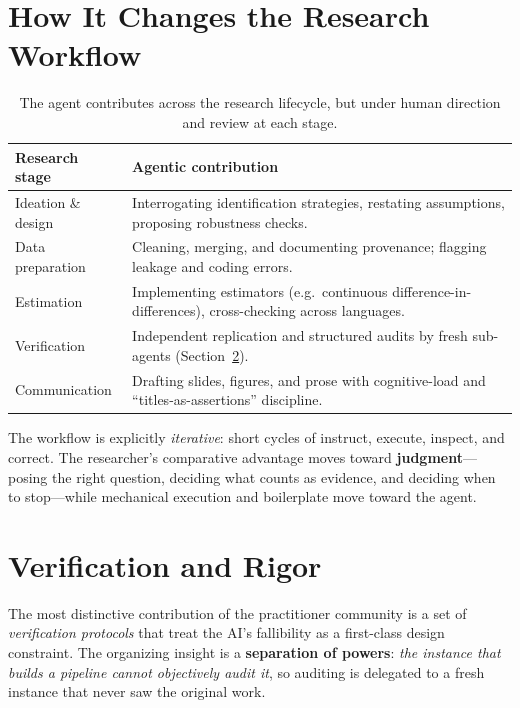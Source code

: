 \documentclass[11pt]{article}
\begin{document}
\section{How It Changes the Research Workflow}
\begin{table}[h]
\centering
\begin{tabular}{@{}p{}p{}@{}}
\toprule
\textbf{Research stage} & \textbf{Agentic contribution} \\
\midrule
Ideation \& design & Interrogating identification strategies, restating
assumptions, proposing robustness checks. \\
Data preparation & Cleaning, merging, and documenting provenance;
flagging leakage and coding errors. \\
Estimation & Implementing estimators (e.g.\ continuous
difference-in-differences), cross-checking across languages. \\
Verification & Independent replication and structured audits by fresh
sub-agents (Section~\ref{sec:verify}). \\
Communication & Drafting slides, figures, and prose with cognitive-load and
``titles-as-assertions'' discipline. \\
\bottomrule
\end{tabular}
\caption{The agent contributes across the research lifecycle, but under human
direction and review at each stage.}
\end{table}

The workflow is explicitly \emph{iterative}: short cycles of instruct, execute,
inspect, and correct. The researcher's comparative advantage moves toward
\textbf{judgment}---posing the right question, deciding what counts as
evidence, and deciding when to stop---while mechanical execution and
boilerplate move toward the agent.

\section{Verification and Rigor}\label{sec:verify}
The most distinctive contribution of the practitioner community is a set of
\emph{verification protocols} that treat the AI's fallibility as a first-class
design constraint. The organizing insight is a \textbf{separation of powers}:
\emph{the instance that builds a pipeline cannot objectively audit it}, so
auditing is delegated to a fresh instance that never saw the original work.
\end{document}
